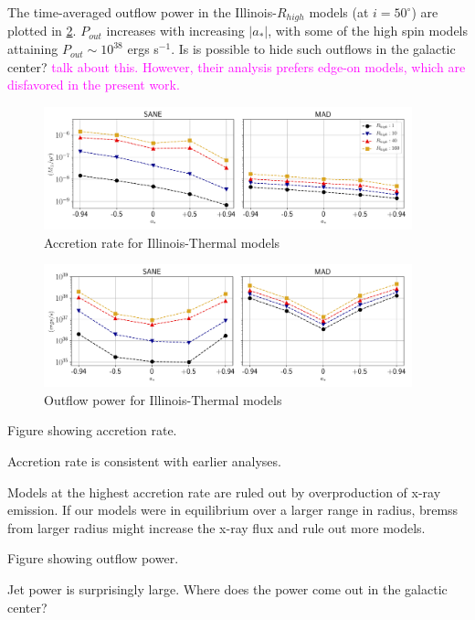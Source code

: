 The time-averaged outflow power in the Illinois-$R_{high}$ models (at $i=50^{\circ}$) are plotted in \ref{fig:outflow_illinois_thermal}. $P_{out}$ increases with increasing $|a_{*}|$, with some of the high spin models attaining $P_{out}\sim 10^{38}$ ergs s$^{-1}$. Is is possible to hide such outflows in the galactic center? \textcolor{magenta}{\citet{2007MNRAS.379.1519M} talk about this. However, their analysis prefers edge-on models, which are disfavored in the present work.}

\begin{figure}
\centering
\includegraphics[width=0.95\textwidth]{figures/illinoisv3_average_mdot.png}
\caption{Accretion rate for Illinois-Thermal models}
\label{fig:accretion_illinois_thermal}
\end{figure}

\begin{figure}
\centering
\includegraphics[width=0.95\textwidth]{figures/illinoisv3_average_outflow_power.png}
\caption{Outflow power for Illinois-Thermal models}
\label{fig:outflow_illinois_thermal}
\end{figure}

Figure showing accretion rate.

Accretion rate is consistent with earlier analyses.

Models at the highest accretion rate are ruled out by overproduction of x-ray emission.  If our models were in equilibrium over a larger range in radius, bremss from larger radius might increase the x-ray flux and rule out more models.

Figure showing outflow power.

Jet power is surprisingly large.  Where does the power come out in the galactic center?

